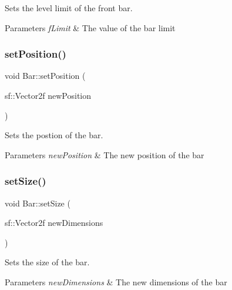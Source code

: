 Sets the level limit of the front bar. 


\begin{DoxyParams}{Parameters}
{\em f\+Limit} & The value of the bar limit \\
\hline
\end{DoxyParams}
\mbox{\label{class_bar_a6b574e2df859cf2d0fd2b0928579393a}} 
\subsubsection{\texorpdfstring{set\+Position()}{setPosition()}}
{\footnotesize\ttfamily void Bar\+::set\+Position (\begin{DoxyParamCaption}\item[{sf\+::\+Vector2f}]{new\+Position }\end{DoxyParamCaption})}



Sets the postion of the bar. 


\begin{DoxyParams}{Parameters}
{\em new\+Position} & The new position of the bar \\
\hline
\end{DoxyParams}
\mbox{\label{class_bar_abe63c0117d6057e6db84ec0cdba48b21}} 
\subsubsection{\texorpdfstring{set\+Size()}{setSize()}}
{\footnotesize\ttfamily void Bar\+::set\+Size (\begin{DoxyParamCaption}\item[{sf\+::\+Vector2f}]{new\+Dimensions }\end{DoxyParamCaption})}



Sets the size of the bar. 


\begin{DoxyParams}{Parameters}
{\em new\+Dimensions} & The new dimensions of the bar \\
\hline
\end{DoxyParams}
\mbox{\label{class_bar_a34103f97383ec042f6a69f1da2397c2c}} 
